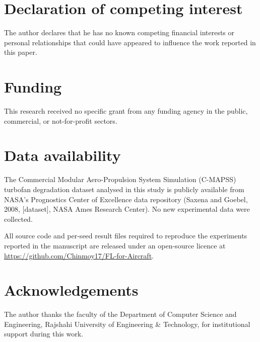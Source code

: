\documentclass[a4paper,fleqn]{cas-sc}
\begin{document}
\section*{Declaration of competing interest}
The author declares that he has no known competing financial
interests or personal relationships that could have appeared to
influence the work reported in this paper.

\section*{Funding}
This research received no specific grant from any funding agency in
the public, commercial, or not-for-profit sectors.

\section*{Data availability}
The Commercial Modular Aero-Propulsion System Simulation (C-MAPSS)
turbofan degradation dataset analysed in this study is publicly
available from NASA's Prognostics Center of Excellence data
repository (Saxena and Goebel, 2008, [dataset], NASA Ames Research
Center). No new experimental data were collected.

All source code and per-seed result files required to reproduce the
experiments reported in the manuscript are released under an
open-source licence at
\url{https://github.com/Chinmoy17/FL-for-Aircraft}.

\section*{Acknowledgements}
The author thanks the faculty of the Department of Computer Science
and Engineering, Rajshahi University of Engineering \& Technology,
for institutional support during this work.
\end{document}
